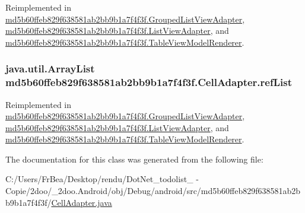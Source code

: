 Reimplemented in \hyperlink{classmd5b60ffeb829f638581ab2bb9b1a7f4f3f_1_1_grouped_list_view_adapter_e887eb8c51f6679bbffdba979210ff48}{md5b60ffeb829f638581ab2bb9b1a7f4f3f.GroupedListViewAdapter}, \hyperlink{classmd5b60ffeb829f638581ab2bb9b1a7f4f3f_1_1_list_view_adapter_3484b09d18c193e3a6efbf9abd22592a}{md5b60ffeb829f638581ab2bb9b1a7f4f3f.ListViewAdapter}, and \hyperlink{classmd5b60ffeb829f638581ab2bb9b1a7f4f3f_1_1_table_view_model_renderer_21b72c97f46fee0f30a471fc36c20e2c}{md5b60ffeb829f638581ab2bb9b1a7f4f3f.TableViewModelRenderer}.\hypertarget{classmd5b60ffeb829f638581ab2bb9b1a7f4f3f_1_1_cell_adapter_954a374de657ac52ab7febec23bbae94}{
\subsubsection[{refList}]{\setlength{\rightskip}{0pt plus 5cm}java.util.ArrayList {\bf md5b60ffeb829f638581ab2bb9b1a7f4f3f.CellAdapter.refList}}}
\label{classmd5b60ffeb829f638581ab2bb9b1a7f4f3f_1_1_cell_adapter_954a374de657ac52ab7febec23bbae94}




Reimplemented in \hyperlink{classmd5b60ffeb829f638581ab2bb9b1a7f4f3f_1_1_grouped_list_view_adapter_aa8849c73c487cac5b8a78f850930321}{md5b60ffeb829f638581ab2bb9b1a7f4f3f.GroupedListViewAdapter}, \hyperlink{classmd5b60ffeb829f638581ab2bb9b1a7f4f3f_1_1_list_view_adapter_2b206b389692997413bd835dceb3d7ec}{md5b60ffeb829f638581ab2bb9b1a7f4f3f.ListViewAdapter}, and \hyperlink{classmd5b60ffeb829f638581ab2bb9b1a7f4f3f_1_1_table_view_model_renderer_367cc615fe3d215e4dd9e298f20d871a}{md5b60ffeb829f638581ab2bb9b1a7f4f3f.TableViewModelRenderer}.

The documentation for this class was generated from the following file:\begin{CompactItemize}
\item 
C:/Users/FrBea/Desktop/rendu/DotNet\_\-todolist\_ - Copie/2doo/\_\-2doo.Android/obj/Debug/android/src/md5b60ffeb829f638581ab2bb9b1a7f4f3f/\hyperlink{_cell_adapter_8java}{CellAdapter.java}\end{CompactItemize}

